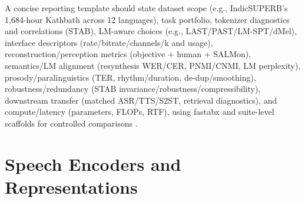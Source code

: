\documentclass{article}
\begin{document}
A concise reporting template should state dataset scope (e.g., IndicSUPERB's 1,684-hour Kathbath across 12 languages), task portfolio, tokenizer diagnostics and correlations (STAB), LM-aware choices (e.g., LAST/PAST/LM-SPT/dMel), interface descriptors (rate/bitrate/channels/k and usage), reconstruction/perception metrics (objective + human + SALMon), semantics/LM alignment (resynthesis WER/CER, PNMI/CNMI, LM perplexity), prosody/paralinguistics (TER, rhythm/duration, de-dup/smoothing), robustness/redundancy (STAB invariance/robustness/compressibility), downstream transfer (matched ASR/TTS/S2ST, retrieval diagnostics), and compute/latency (parameters, FLOPs, RTF), using fastabx and suite-level scaffolds for controlled comparisons \cite{vashishth2024stabspeechtokenizerassessmentbenchmark,turetzky2024lastlanguagemodelawarespeechtokenization,har-tuv2025pastphoneticacousticspeechtokenizer,bai2025dmelspeechtokenizationmadesimple,jo2025lmsptalignedsemanticdistillationspeechto,poli2025fastabxlibraryefficientcomputationabxdis,entry2025indicsuperbspeechprocessinguniversalperf}.

















\section{Speech Encoders and Representations} \label{sec:Speech Encoders and Representations}
\end{document}
